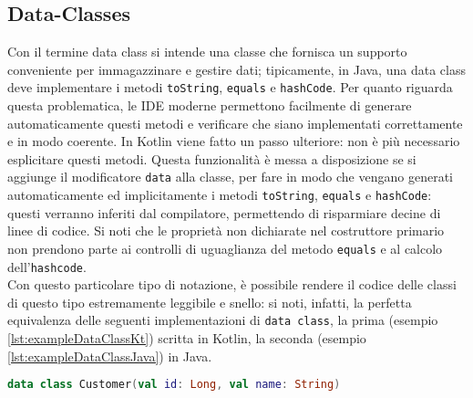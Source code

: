 \subsection{Data-Classes}
Con il termine data class si intende una classe che fornisca un supporto conveniente per immagazzinare e gestire dati; tipicamente, in Java, una data class deve implementare i metodi \texttt{toString}, \texttt{equals} e \texttt{hashCode}. Per quanto riguarda questa problematica, le IDE moderne permettono facilmente di generare automaticamente questi metodi e verificare che siano implementati correttamente e in modo coerente. In Kotlin viene fatto un passo ulteriore: non è più necessario esplicitare questi metodi. Questa funzionalità è messa a disposizione se si aggiunge il modificatore \texttt{data} alla classe, per fare in modo che vengano generati automaticamente ed implicitamente i metodi \texttt{toString}, \texttt{equals} e \texttt{hashCode}: questi verranno inferiti dal compilatore, permettendo di risparmiare decine di linee di codice. Si noti che le proprietà non dichiarate nel costruttore primario non prendono parte ai controlli di uguaglianza del metodo \texttt{equals} e al calcolo dell’\texttt{hashcode}.\\
Con questo particolare tipo di notazione, è possibile rendere il codice delle classi di questo tipo estremamente leggibile e snello: si noti, infatti, la perfetta equivalenza delle seguenti implementazioni di \texttt{data class}, la prima (esempio \ref{lst:exampleDataClassKt}) scritta in Kotlin, la seconda (esempio \ref{lst:exampleDataClassJava}) in Java.\\

\begin{lstlisting}[caption={Data Class in Kotlin}, captionpos=b, label={lst:exampleDataClassKt}, language=Kotlin]
data class Customer(val id: Long, val name: String)
\end{lstlisting}

